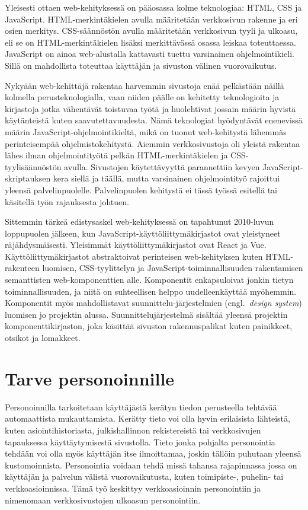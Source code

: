 \documentclass[finnish, 12pt, a4paper, elec, utf8, a-1b, online]{aaltothesis}
\begin{document}
Yleisesti ottaen web-kehityksessä on pääosassa kolme teknologiaa: HTML, CSS ja
JavaScript. HTML-merkintäkielen avulla määritetään verkkosivun rakenne ja eri
osien merkitys. CSS-säännöstön avulla määritetään verkkosivun tyyli ja ulkoasu,
eli se on HTML-merkintäkielen lisäksi merkittävässä osassa leiskaa toteuttaessa.
JavaScript on ainoa web-alustalla kattavasti tuettu varsinainen
ohjelmointikieli. Sillä on mahdollista toteuttaa käyttäjän ja sivuston välinen
vuorovaikutus.

Nykyään web-kehittäjä rakentaa harvemmin sivustoja enää pelkästään näillä
kolmella perusteknologialla, vaan niiden päälle on kehitetty teknologioita ja
kirjastoja jotka vähentävät toistuvaa työtä ja huolehtivat jossain määrin
hyvistä käytänteistä kuten saavutettavuudesta. Nämä teknologiat hyödyntävät
enenevissä määrin JavaScript-ohjelmointikieltä, mikä on tuonut web-kehitystä
lähemmäs perinteisempää ohjelmistokehitystä. Aiemmin verkkosivustoja oli yleistä
rakentaa lähes ilman ohjelmointityötä pelkän HTML-merkintäkielen ja
CSS-tyylisäännöstön avulla. Sivustojen käytettävyyttä parannettiin kevyen
JavaScript-skriptauksen kera siellä ja täällä, mutta varsinainen ohjelmointityö
rajoittui yleensä palvelinpuolelle. Palvelinpuolen kehitystä ei tässä työssä
esitellä tai käsitellä työn rajauksesta johtuen.

Sittemmin tärkeä edistysaskel web-kehityksessä on tapahtunut 2010-luvun
loppupuolen jälkeen, kun JavaScript-käyttöliittymäkirjastot ovat yleistyneet
räjähdysmäisesti. Yleisimmät käyttöliittymäkirjastot ovat React ja Vue.
Käyttöliittymäkirjastot abstraktoivat perinteisen web-kehityksen kuten
HTML-rakenteen luomisen, CSS-tyylittelyn ja JavaScript-toiminnallisuuden
rakentamisen semanttisten web-komponenttien alle. Komponentit enkapsuloivat
jonkin tietyn toiminnallisuuden, ja niitä on suhteellisen helppo
uudelleenkäyttää myöhemmin. Komponentit myös mahdollistavat
suunnittelu-järjestelmien (engl.\ \textit{design system}) luomisen jo projektin
alussa. Suunnittelujärjestelmä sisältää yleensä projektin komponenttikirjaston,
joka käsittää sivuston rakennuspalikat kuten painikkeet, otsikot ja lomakkeet.

\clearpage

\section{Tarve personoinnille}

Personoinnilla tarkoitetaan käyttäjästä kerätyn tiedon perusteella tehtävää
automaattista mukauttamista. Kerätty tieto voi olla hyvin erilaisista lähteistä,
kuten asiointihistoriasta, julkishallinnon rekistereistä tai verkkosivujen
tapauksessa käyttäytymisestä sivustolla. Tieto jonka pohjalta personointia
tehdään voi olla myös käyttäjän itse ilmoittamaa, joskin tällöin puhutaan
yleensä kustomoinnista. Personointia voidaan tehdä missä tahansa rajapinnassa
jossa on käyttäjän ja palvelun välistä vuorovaikutusta, kuten toimipiste-,
puhelin- tai verkkoasioinnissa. Tämä työ keskittyy verkkoasioinnin personointiin
ja nimenomaan verkkosivustojen ulkoasun personointiin.
\end{document}
